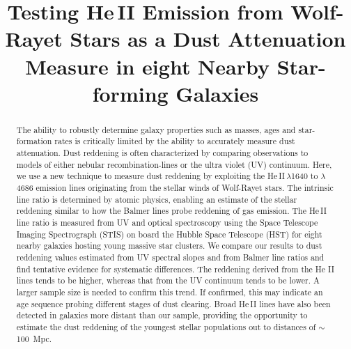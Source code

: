 \documentclass[]{aastex63}
\begin{document}
\title{Testing He\,II Emission from Wolf-Rayet Stars as a Dust Attenuation Measure in eight Nearby Star-forming Galaxies}




\begin{abstract}
The ability to robustly determine galaxy properties such as masses, ages and star-formation rates is critically limited by the ability to accurately measure dust attenuation. 
Dust reddening is often characterized by comparing observations to models of either nebular recombination-lines or the ultra violet (UV) continuum. 
Here, we use a new technique to measure dust reddening by exploiting the He\,II\,$\lambda$1640 to $\lambda$4686 emission lines originating from the stellar winds of Wolf-Rayet stars. 
The intrinsic line ratio is determined by atomic physics, enabling an estimate of the stellar reddening similar to how the Balmer lines probe reddening of gas emission. 
The He\,II line ratio is measured from UV and optical spectroscopy using the Space Telescope Imaging Spectrograph (STIS) on board the Hubble Space Telescope (HST) for eight nearby galaxies hosting young massive star clusters.
We compare our results to dust reddening values estimated from UV spectral slopes and from Balmer line ratios and find tentative evidence for systematic differences. The reddening derived from the He II lines tends to be higher, whereas that from the UV continuum tends to be lower. A larger sample size is needed to confirm this trend. If confirmed, this may indicate an age sequence probing different stages of dust clearing.
Broad He\,II lines have also been detected in galaxies more distant than our sample, providing the opportunity to estimate the dust reddening of the youngest stellar populations out to distances of $\sim$100~Mpc.
\end{abstract}

\end{document}

